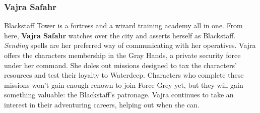 \documentclass[10pt,a4paper,twoside,twocolumn,openany,nodeprecatedcode]{dndbook}
\begin{document}
\subsubsection{Vajra Safahr}
Blackstaff Tower is a fortress and a wizard training academy all in one. From here, \textbf{Vajra Safahr} watches over the city and asserts herself as Blackstaff. \textit{Sending} spells are her preferred way of communicating with her operatives.
Vajra offers the characters membership in the Gray Hands, a private security force under her command. She doles out missions designed to tax the characters' resources and test their loyalty to Waterdeep. Characters who complete these missions won't gain enough renown to join Force Grey yet, but they will gain something valuable: the Blackstaff's patronage. Vajra continues to take an interest in their adventuring careers, helping out when she can.
\end{document}
